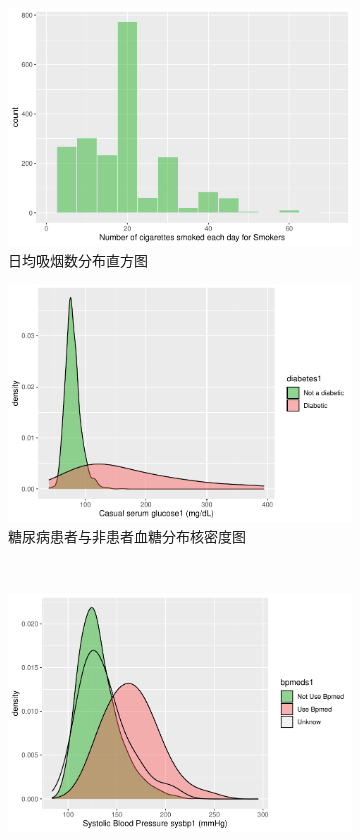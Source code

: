 \documentclass[lang=cn,11pt,a4paper,cite=super,AutoFakeBold]{elegantpaper}
\begin{document}
   \begin{figure}[!hbt]
      \begin{subfigure}[b]{0.49\textwidth}
        \centering
        \includegraphics[width=0.8\linewidth]{img/cig1-1.pdf}  
      \caption{日均吸烟数分布直方图}
      \label{fig:rjxyzft}
      \end{subfigure}
      \begin{subfigure}[b]{0.49\textwidth}
        \centering
        \includegraphics[width=\linewidth]{img/glu2-1.pdf}  
        \caption{糖尿病患者与非患者血糖分布核密度图}
        \label{fig:tnbxt}
      \end{subfigure}
      ~
      \begin{subfigure}[b]{0.49\textwidth}
         \centering
         \includegraphics[width=\linewidth]{img/sys3-1.pdf}  

\end{subfigure}
\end{figure}
\end{document}

